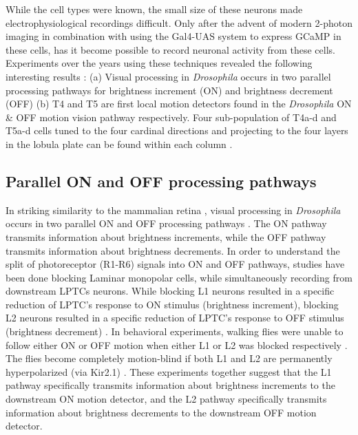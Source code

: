 While the cell types were known, the small size of these neurons made electrophysiological recordings difficult. Only after the advent of modern 2-photon imaging in combination with using the Gal4-UAS system to express GCaMP in these cells, has it become possible to record neuronal activity from these cells. Experiments over the years using these techniques revealed the following interesting results : (a) Visual processing in \textit{Drosophila} occurs in two parallel processing pathways for brightness increment (ON) and brightness decrement (OFF) \parencite{Joesch2010, Joesch2013, Strother2014, Eichner2011, Behnia2014, Shinomiya2014} (b) T4 and T5 are first local motion detectors found in the \textit{Drosophila} ON \& OFF motion vision pathway respectively. Four sub-population of T4a-d and T5a-d cells tuned to the four cardinal directions and projecting to the four layers in the lobula plate can be found within each column \parencite{Maisak2013}. 


\subsection{Parallel ON and OFF processing pathways}
In striking similarity to the mammalian retina \parencite{Masland2012}, visual processing in \textit{Drosophila} occurs in two parallel ON and OFF processing pathways \parencite{Borst2015}. The ON pathway transmits information about brightness increments, while the OFF pathway transmits information about brightness decrements. In order to understand the split of photoreceptor (R1-R6) signals into ON and OFF pathways, studies have been done blocking Laminar monopolar cells, while simultaneously recording from downstream LPTCs neurons. While blocking L1 neurons resulted in a specific reduction of LPTC's response to ON stimulus (brightness increment), blocking L2 neurons resulted in a specific reduction of LPTC's response to OFF stimulus (brightness decrement) \parencite{Joesch2010}. In behavioral experiments, walking flies were unable to follow either ON or OFF motion when either L1 or L2 was blocked respectively \parencite{Clark2011}. The flies become completely motion-blind if both L1 and L2 are permanently hyperpolarized (via Kir2.1) \parencite{Tuthill2013, Bahl2013}. These experiments together suggest that the L1 pathway specifically transmits information about brightness increments to the downstream ON motion detector, and the L2 pathway specifically transmits information about brightness decrements to the downstream OFF motion detector. 

